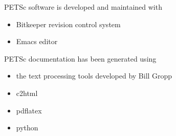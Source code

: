 PETSc software is developed and maintained with 
\begin{itemize}
\item Bitkeeper revision control system
\item Emacs editor
\end{itemize}

PETSc documentation has been generated using
\begin{itemize}
\item the text processing tools developed by Bill Gropp
\item c2html
\item pdflatex
\item python
\end{itemize}

